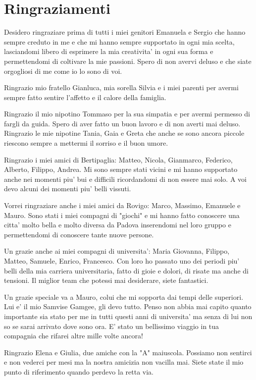 \section{Ringraziamenti}
Desidero ringraziare prima di tutti i miei genitori Emanuela e Sergio che hanno sempre creduto in me e che mi hanno sempre supportato in ogni mia scelta, lasciandomi libero di esprimere la mia creativita' in ogni sua forma e permettendomi di coltivare la mie passioni. Spero di non avervi deluso e che siate orgogliosi di me come io lo sono di voi.

Ringrazio mio fratello Gianluca, mia sorella Silvia e i miei parenti per avermi sempre fatto sentire l'affetto e il calore della famiglia.

Ringrazio il mio nipotino Tommaso per la sua simpatia e per avermi permesso di fargli da guida. Spero di aver fatto un buon lavoro e di non averti mai deluso. Ringrazio le mie nipotine Tania, Gaia e Greta che anche se sono ancora piccole riescono sempre a mettermi il sorriso e il buon umore.

Ringrazio i miei amici di Bertipaglia: Matteo, Nicola, Gianmarco, Federico, Alberto, Filippo, Andrea. Mi sono sempre stati vicini e mi hanno supportato anche nei momenti piu' bui e difficili ricordandomi di non essere mai solo. A voi devo alcuni dei momenti piu' belli vissuti.

Vorrei ringraziare anche i miei amici da Rovigo: Marco, Massimo, Emanuele e Mauro. Sono stati i miei compagni di "giochi" e mi hanno fatto conoscere una citta' molto bella e molto diversa da Padova inserendomi nel loro gruppo e permettendomi di conoscere tante nuove persone.

Un grazie anche ai miei compagni di universita': Maria Giovanna, Filippo, Matteo, Samuele, Enrico, Francesco. Con loro ho passato uno dei periodi piu' belli della mia carriera universitaria, fatto di gioie e dolori, di risate ma anche di tensioni. Il miglior team che potessi mai desiderare, siete fantastici.

Un grazie speciale va a Mauro, colui che mi sopporta dai tempi delle superiori. Lui e' il mio Samvise Gamgee, gli devo tutto. Penso non abbia mai capito quanto importante sia stato per me in tutti questi anni di universita' ma senza di lui non so se sarai arrivato dove sono ora. E' stato un bellissimo viaggio in tua compagnia che rifarei altre mille volte ancora!

Ringrazio Elena e Giulia, due amiche con la "A" maiuscola. Possiamo non sentirci e non vederci per mesi ma la nostra amicizia non vacilla mai. Siete state il mio punto di riferimento quando perdevo la retta via.

